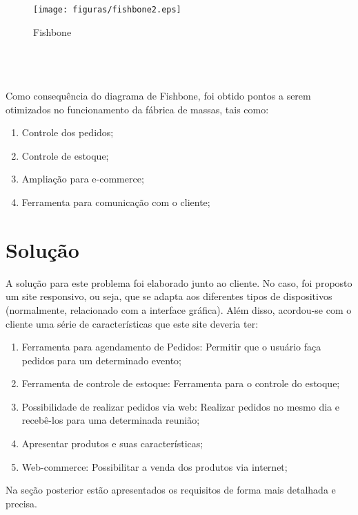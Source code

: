 \begin{figure}[h]
    \centering
    \label{fig01}
        \texttt{[image: figuras/fishbone2.eps]}
    \caption{Fishbone}
\end{figure}

\tab \\ \\ \\ 

\tab Como consequência do diagrama de Fishbone, foi obtido pontos a serem otimizados no funcionamento da fábrica de massas, tais como:

\begin{enumerate}
	\item Controle dos pedidos;
	\item Controle de estoque;
	\item Ampliação para e-commerce;
	\item Ferramenta para comunicação com o cliente;
\end{enumerate}


{\large {\section { Solução \\ } } }

A solução para este problema foi elaborado junto ao cliente. No caso, foi proposto um site responsivo, ou seja, que se adapta aos diferentes tipos de dispositivos (normalmente, relacionado com a interface gráfica).  Além disso, acordou-se com o cliente uma série de características que este site deveria ter:

\begin{enumerate}
	\item Ferramenta para agendamento de Pedidos: Permitir que o usuário faça pedidos para um determinado evento;
	\item Ferramenta de controle de estoque: Ferramenta para o controle do estoque;
	\item Possibilidade de realizar pedidos via web: Realizar pedidos no mesmo dia e recebê-los para uma determinada reunião;
	\item Apresentar produtos e suas características;
	\item Web-commerce: Possibilitar a venda dos produtos  via internet;
\end{enumerate}

\tab Na seção posterior estão apresentados os requisitos de forma mais detalhada e precisa.

